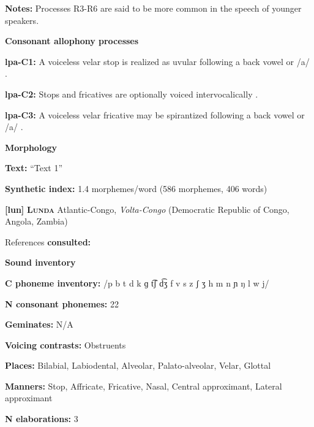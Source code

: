 \textbf{Notes:} Processes R3-R6 are said to be more common in the speech of younger speakers.



\textbf{Consonant allophony processes}



\textbf{lpa-C1:} A voiceless velar stop is realized as uvular following a back vowel or /a/ \citep[19]{Lacrampe2014}.



\textbf{lpa-C2:} Stops and fricatives are optionally voiced intervocalically \citep[17]{Lacrampe2014}.



\textbf{lpa-C3:} A voiceless velar fricative may be spirantized following a back vowel or /a/ \citep[20]{Lacrampe2014}.



\textbf{Morphology}



\textbf{Text:} “Text 1” \citep[495-500]{Lacrampe2014}



\textbf{Synthetic index:} 1.4 morphemes/word (586 morphemes, 406 words)



\textbf{[lun]}   \textbf{\textsc{Lunda}  }  Atlantic-Congo, \textit{Volta-Congo} (Democratic Republic of Congo, Angola, Zambia)



References \textbf{consulted:} \citet{Kawasha2003}



\textbf{Sound inventory}



\textbf{C phoneme inventory:} /p b t d k ɡ t͡ʃ d͡ʒ f v s z ʃ ʒ h m n ɲ ŋ l w j/



\textbf{N consonant phonemes:} 22



\textbf{Geminates:} N/A



\textbf{Voicing contrasts:} Obstruents



\textbf{Places:} Bilabial, Labiodental, Alveolar, Palato-alveolar, Velar, Glottal



\textbf{Manners:} Stop, Affricate, Fricative, Nasal, Central approximant, Lateral approximant



\textbf{N elaborations:} 3




